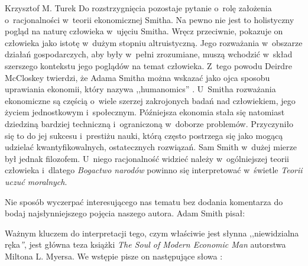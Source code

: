 \begin{artplenv}{Krzysztof M. Turek}
Do rozstrzygnięcia pozostaje pytanie o~rolę założenia o~racjonalności w~teorii ekonomicznej Smitha. Na pewno nie jest to
holistyczny pogląd na naturę człowieka w~ujęciu Smitha. Wręcz przeciwnie, pokazuje on człowieka jako istotę w~dużym
stopniu altruistyczną. Jego rozważania w~obszarze działań gospodarczych, aby były w~pełni zrozumiane, muszą
wchodzić w~skład szerszego kontekstu jego poglądów na temat człowieka. Z~tego powodu Deirdre McCloskey
twierdzi, że Adama Smitha można
wskazać jako ojca sposobu uprawiania ekonomii, który nazywa ,,humanomics''
\parencite[s.~20]{mccloskey_bourgeois_2016}.
U~Smitha rozważania ekonomiczne są częścią o~wiele szerzej zakrojonych badań nad człowiekiem, jego życiem
jednostkowym i~społecznym. Późniejsza ekonomia stała się natomiast dziedziną bardziej
techniczną i~ograniczoną w~doborze problemów. Przyczyniło się to do jej sukcesu i~prestiżu nauki,
którą często postrzega się jako mogącą udzielać
kwantyfikowalnych, ostatecznych rozwiązań. Sam Smith w~dużej mierze był jednak filozofem. U~niego racjonalność widzieć
należy w~ogólniejszej teorii człowieka i~dlatego \textit{Bogactwo narodów} powinno się
interpretować w~świetle \textit{Teorii uczuć moralnych}.

Nie sposób wyczerpać interesującego nas tematu bez dodania komentarza do bodaj najsłynniejszego pojęcia naszego autora.
Adam Smith
\parencite*[s.~46]{smith_badania_2007}
pisał:

Ważnym kluczem do interpretacji tego, czym właściwie jest słynna ,,niewidzialna ręka\textit{''}, jest główna teza książki
\textit{The Soul of Modern Economic Man} autorstwa Miltona L. Myersa. We wstępie pisze on następujące słowa
\parencite[s.~2]{myers_soul_1983}:



\end{artplenv}
